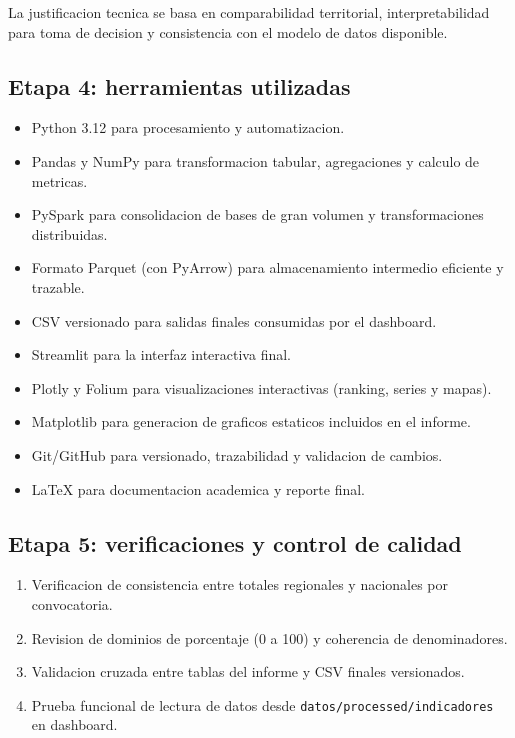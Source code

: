 \documentclass[12pt,letterpaper]{article}
\begin{document}
La justificacion tecnica se basa en comparabilidad territorial, interpretabilidad para toma de decision y consistencia con el modelo de datos disponible.

\subsection{Etapa 4: herramientas utilizadas}

\begin{itemize}
  \item Python 3.12 para procesamiento y automatizacion.
  \item Pandas y NumPy para transformacion tabular, agregaciones y calculo de metricas.
  \item PySpark para consolidacion de bases de gran volumen y transformaciones distribuidas.
  \item Formato Parquet (con PyArrow) para almacenamiento intermedio eficiente y trazable.
  \item CSV versionado para salidas finales consumidas por el dashboard.
  \item Streamlit para la interfaz interactiva final.
  \item Plotly y Folium para visualizaciones interactivas (ranking, series y mapas).
  \item Matplotlib para generacion de graficos estaticos incluidos en el informe.
  \item Git/GitHub para versionado, trazabilidad y validacion de cambios.
  \item LaTeX para documentacion academica y reporte final.
\end{itemize}

\subsection{Etapa 5: verificaciones y control de calidad}

\begin{enumerate}[label=\arabic*.]
  \item Verificacion de consistencia entre totales regionales y nacionales por convocatoria.
  \item Revision de dominios de porcentaje (0 a 100) y coherencia de denominadores.
  \item Validacion cruzada entre tablas del informe y CSV finales versionados.
  \item Prueba funcional de lectura de datos desde \texttt{datos/processed/indicadores} en dashboard.
\end{enumerate}
\end{document}
